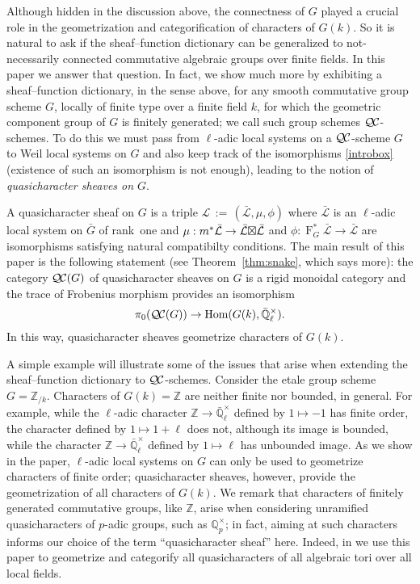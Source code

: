 \documentclass{amsart}
\theoremstyle{plain}
\theoremstyle{definition}
\theoremstyle{remark}
\newcommand{\ZZ}{{\mathbb{Z}}}
\newcommand{\EE}{\mathbb{\bar Q}_\ell}
\newcommand{\Qp}{\mathbb{Q}_p}
\newcommand{\Fq}{k}
\newcommand{\EEx}{\EE^\times}
\newcommand{\Frob}[1]{\operatorname{F}_{#1}}
\DeclareMathOperator{\Hom}{Hom}
\newcommand{\ceq}{{\, :=\, }}
\newcommand{\qcs}[1]{{\mathcal{#1}}}
\newcommand{\gqcs}[1]{{\mathcal{\bar #1}}}
\newcommand{\QC}{{\mathcal{Q\hskip-0.8pt C}}}
\newcommand{\QCiso}[1]{\pi_0 (\QC(#1))}
\newcommand{\bG}{\bar{G}}
\newcommand{\tight}[3]{\hspace{-#1pt}{#2}\hspace{-#3pt}}
\newcommand{\LxL}{\text{$\gqcs{L} \tight{0}{\boxtimes}{0} \gqcs{L}$}}
\begin{document}
Although hidden in the discussion above, the connectness of $G$ played a crucial role in the geometrization and categorification of characters of $G(\Fq)$.  So it is natural to ask if the sheaf--function dictionary can be generalized to not-necessarily connected commutative algebraic groups over finite fields. In this paper we answer that question. 
%
In fact, we show much more by exhibiting a sheaf--function dictionary, in the sense above, for any smooth commutative group scheme $G$, locally of finite type over a finite field $\Fq$, 
for which the geometric component group of $G$ is finitely generated; we call such group schemes $\QC$-schemes.
To do this we must pass from $\ell$-adic local systems on a $\QC$-scheme $G$ to Weil local systems on $G$ 
and also keep track of the isomorphisms \eqref{introbox} (existence of such an isomorphism is not enough), leading to the notion of {\it quasicharacter sheaves on $G$}. 

A quasicharacter sheaf on $G$ is a triple $\qcs{L}\ceq
(\gqcs{L},\mu,\phi)$ where $\gqcs{L}$ is an $\ell$-adic local system on $\bG$ of rank~one and $\mu: m^*
\gqcs{L} \to \LxL$ and $\phi : \Frob{G}^*\gqcs{L} \to \gqcs{L}$ are isomorphisms satisfying natural compatibilty conditions. The main result of this paper is the following statement (see Theorem~\ref{thm:snake}, which says more): 
the category $\QC(G)$ of quasicharacter sheaves on $G$
is a rigid monoidal category and the trace of Frobenius morphism provides an isomorphism
\begin{equation}
\QCiso{G} \to \Hom(G(\Fq), \EEx).
\end{equation}
In this way, quasicharacter sheaves geometrize characters of $G(\Fq)$.

A simple example will illustrate some of the issues that arise when extending the sheaf--function dictionary to $\QC$-schemes. 
Consider the etale group scheme $G = \ZZ_{/\Fq}$. 
Characters of $G(\Fq) = \ZZ$ are neither finite nor bounded, in general. 
For example, while the $\ell$-adic character $\ZZ \to \EEx$ defined by 
$1 \mapsto -1$ has finite order, the character defined by 
$1 \mapsto 1+ \ell$ does not, although its image is bounded, while the character $\ZZ \to \EEx$ defined by 
$1 \mapsto \ell$ has unbounded image.  
As we show in the paper, $\ell$-adic local systems on $G$ can only be used to geometrize characters of finite order; quasicharacter sheaves, however, provide the geometrization of all characters of $G(\Fq)$.
We remark that characters of finitely generated commutative groups, like $\ZZ$, 
arise when considering unramified quasicharacters of $p$-adic groups, 
such as $\Qp^\times$; in fact, aiming at such characters informs our choice of the term ``quasicharacter sheaf'' here.  Indeed, in \cite{cunningham-roe:p-adic_tori} we use this paper to geometrize and categorify all quasicharacters of all algebraic tori over all local fields. 
\end{document}
